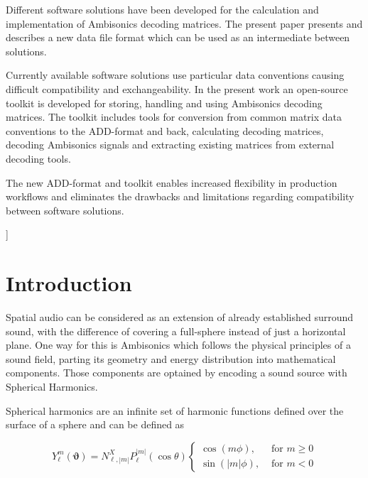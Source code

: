 \documentclass[a4paper, 10pt, twocolumn]{article}
\begin{document}
{\vspace{-3mm}}
\begin{onecolabstract}
{\vspace{3mm}}

Different software solutions have been developed for the calculation and implementation of Ambisonics decoding matrices. The present paper presents and describes a new data file format which can be used as an intermediate between solutions.

Currently available software solutions use particular data conventions causing difficult compatibility and exchangeability. In the present work an open-source toolkit is developed for storing, handling and using Ambisonics decoding matrices. The toolkit includes tools for conversion from common matrix data conventions to the ADD-format and back, calculating decoding matrices, decoding Ambisonics signals and extracting existing matrices from external decoding tools. 

The new ADD-format and toolkit enables increased flexibility in production workflows and eliminates the drawbacks and limitations regarding compatibility between software solutions.

\end{onecolabstract}
{\vspace{8mm}}]

\section{Introduction} \label{sec:introduction}

Spatial audio can be considered as an extension of already established surround sound, with the difference of covering a full-sphere instead of just a horizontal plane. One way for this is Ambisonics which follows the physical principles of a sound field, parting its geometry and energy distribution into mathematical components. Those components are optained by encoding a sound source with Spherical Harmonics.

Spherical harmonics are an infinite set of harmonic functions defined over the surface of a sphere and can be defined as 

\begin{equation}
Y_{\ell}^{m}(\boldsymbol{\vartheta})=N_{\ell,|m|}^{X} P_{\ell}^{|m|}(\cos \theta)\left\{\begin{array}{cc}{\cos (m \phi),} & {\text { for } m \geq 0} \\ {\sin (|m| \phi),} & {\text { for } m<0}\end{array}\right.
\end{equation}
\end{document}

